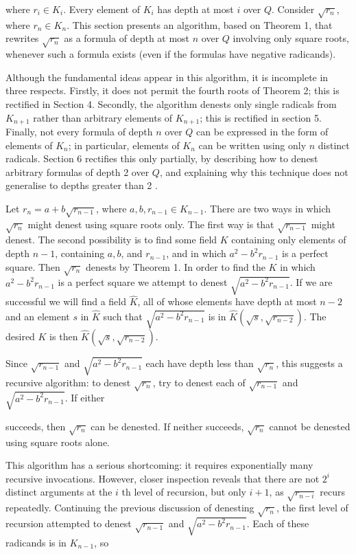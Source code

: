 \documentclass[11pt,letterpaper]{article}
\begin{document}
where $r_{i} \in K_{i}$. Every element of $K_{i}$ has depth at most $i$ over $Q$. Consider $\sqrt{r_{n}}$, where $r_{n} \in K_{n}$. This section presents an algorithm, based on Theorem 1, that rewrites $\sqrt{r_{n}}$ as a formula of depth at most $n$ over $Q$ involving only square roots, whenever such a formula exists (even if the formulas have negative radicands).

Although the fundamental ideas appear in this algorithm, it is incomplete in three respects. Firstly, it does not permit the fourth roots of Theorem 2; this is rectified in Section 4. Secondly, the algorithm denests only single radicals from $K_{n+1}$ rather than arbitrary elements of $K_{n+1}$; this is rectified in section 5. Finally, not every formula of depth $n$ over $Q$ can be expressed in the form of elements of $K_{n}$; in particular, elements of $K_{n}$ can be written using only $n$ distinct radicals. Section 6 rectifies this only partially, by describing how to denest arbitrary formulas of depth 2 over $Q$, and explaining why this technique does not generalise to depths greater than 2 .

Let $r_{n}=a+b \sqrt{r_{n-1}}$, where $a, b, r_{n-1} \in K_{n-1}$. There are two ways in which $\sqrt{r_{n}}$ might denest using square roots only. The first way is that $\sqrt{r_{n-1}}$ might denest. The second possibility is to find some field $K$ containing only elements of depth $n-1$, containing $a, b$, and $r_{n-1}$, and in which $a^{2}-b^{2} r_{n-1}$ is a perfect square. Then $\sqrt{r_{n}}$ denests by Theorem 1. In order to find the $K$ in which $a^{2}-b^{2} r_{n-1}$ is a perfect square we attempt to denest $\sqrt{a^{2}-b^{2} r_{n-1}}$. If we are successful we will find a field $\hat{K}$, all of whose elements have depth at most $n-2$ and an element $s$ in $\hat{K}$ such that $\sqrt{a^{2}-b^{2} r_{n-1}}$ is in $\hat{K}\left(\sqrt{s}, \sqrt{r_{n-2}}\right)$. The desired $K$ is then $\hat{K}\left(\sqrt{s}, \sqrt{r_{n-2}}\right)$.

Since $\sqrt{r_{n-1}}$ and $\sqrt{a^{2}-b^{2} r_{n-1}}$ each have depth less than $\sqrt{r_{n}}$, this suggests a recursive algorithm: to denest $\sqrt{r_{n}}$, try to denest each of $\sqrt{r_{n-1}}$ and $\sqrt{a^{2}-b^{2} r_{n-1}}$. If either

succeeds, then $\sqrt{r_{n}}$ can be denested. If neither succeeds, $\sqrt{r_{n}}$ cannot be denested using square roots alone.

This algorithm has a serious shortcoming: it requires exponentially many recursive invocations. However, closer inspection reveals that there are not $2^i$ distinct arguments at the $i$ th level of recursion, but only $i+1$, as $\sqrt{r_{n-i}}$ recurs repeatedly. Continuing the previous discussion of denesting $\sqrt{r_{n}}$, the first level of recursion attempted to denest $\sqrt{r_{n-1}}$ and $\sqrt{a^{2}-b^{2} r_{n-1}}$. Each of these radicands is in $K_{n-1}$, so
\end{document}
